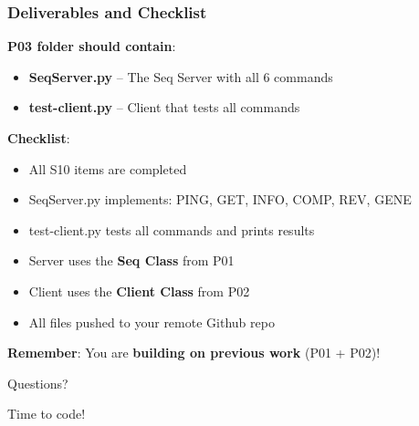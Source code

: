 \documentclass[xcolor=table]{beamer}
\begin{document}
\begin{frame}
\frametitle{Deliverables and Checklist}

\textbf{P03 folder should contain}:

\begin{itemize}
\item \textbf{SeqServer.py} -- The Seq Server with all 6 commands
\item \textbf{test-client.py} -- Client that tests all commands
\end{itemize}

\vspace{0.3cm}

\textbf{Checklist}:
\begin{itemize}
\item[$\square$] All S10 items are completed
\item[$\square$] SeqServer.py implements: PING, GET, INFO, COMP, REV, GENE
\item[$\square$] test-client.py tests all commands and prints results
\item[$\square$] Server uses the \textbf{Seq Class} from P01
\item[$\square$] Client uses the \textbf{Client Class} from P02
\item[$\square$] All files pushed to your remote Github repo
\end{itemize}

\vspace{0.3cm}

\textbf{Remember}: You are \textbf{building on previous work} (P01 + P02)!

\end{frame}


\begin{frame}
\begin{center}
\Huge{Questions?}

\vspace{1cm}

\Large{Time to code!}
\end{center}
\end{frame}
\end{document}
